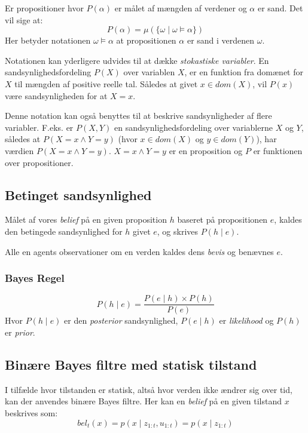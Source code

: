 Er propositioner hvor $P(\alpha)$ er målet af mængden af verdener og $\alpha$ er sand.
Det vil sige at:
$$P(\alpha) = \mu(\{\omega \mid \omega \models \alpha \})$$
Her betyder notationen $\omega \models \alpha$ at propositionen $\alpha$ er sand i verdenen $\omega$.

Notationen kan yderligere udvides til at dække \emph{stokastiske variabler}.
En sandsynlighedsfordeling $P(X)$ over variablen $ X $, er en funktion fra
domænet for $ X $ til mængden af positive reelle tal.
Således at givet $x \in dom(X)$, vil $P(x)$ være sandsynligheden for at $X = x$.

Denne notation kan også benyttes til at beskrive sandsynligheder af flere variabler.
F.eks. er $P(X,Y)$ en sandsynlighedsfordeling over variablerne $ X $ og $ Y $, således at $P(X = x \wedge Y = y)$ (hvor $x \in dom(X)$ og $y \in dom(Y)$), har værdien $P(X = x \wedge Y = y)$.
$X = x \wedge Y = y$ er en proposition og $ P $ er funktionen over propositioner. 

\subsection{Betinget sandsynlighed}

Målet af vores \textit{belief} på en given proposition $ h $ baseret på propositionen $ e $, kaldes den betingede sandsynlighed for $ h $ givet $ e $, og skrives $P(h \mid e)$.

Alle en agents observationer om en verden kaldes dens \emph{bevis} og benævnes $ e $.


\subsubsection{Bayes Regel}

$$P(h \mid e) = \frac{P(e \mid h) \times P(h)}{P(e)}$$
Hvor $P(h \mid e)$ er den \emph{posterior} sandsynlighed, $P(e \mid h)$ er \emph{likelihood} og $P(h)$ er \emph{prior}. 


\subsection{Binære Bayes filtre med statisk tilstand}\label{bayes_binaerfiltre}
I tilfælde hvor tilstanden er statisk, altså hvor verden ikke ændrer sig over tid, kan der anvendes binære Bayes filtre.
Her kan en \textit{belief} på en given tilstand $x$ beskrives som:
\begin{equation}
bel_t(x) = p(x \mid z_{1:t},u_{1:t}) = p(x \mid z_{1:t})
\end{equation}

